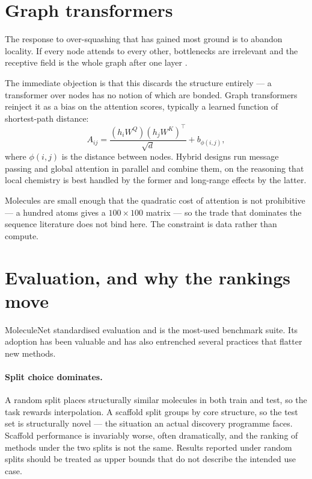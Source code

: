 \documentclass[11pt,a4paper]{article}
\begin{document}
\section{Graph transformers}
\label{sec:transformers}

The response to over-squashing that has gained most ground is to abandon
locality. If every node attends to every other, bottlenecks are irrelevant and
the receptive field is the whole graph after one layer \cite{ying2021}.

The immediate objection is that this discards the structure entirely --- a
transformer over nodes has no notion of which are bonded. Graph transformers
reinject it as a bias on the attention scores, typically a learned function of
shortest-path distance:
\begin{equation}
  A_{ij} = \frac{(h_i W^Q)(h_j W^K)^{\top}}{\sqrt{d}} + b_{\phi(i,j)},
\end{equation}
where $\phi(i,j)$ is the distance between nodes. Hybrid designs
\cite{rampasek2022} run message passing and global attention in parallel and
combine them, on the reasoning that local chemistry is best handled by the
former and long-range effects by the latter.

Molecules are small enough that the quadratic cost of attention is not
prohibitive --- a hundred atoms gives a $100 \times 100$ matrix --- so the
trade that dominates the sequence literature does not bind here. The
constraint is data rather than compute.

\section{Evaluation, and why the rankings move}
\label{sec:evaluation}

MoleculeNet \cite{wu2018} standardised evaluation and is the most-used
benchmark suite. Its adoption has been valuable and has also entrenched
several practices that flatter new methods.

\paragraph{Split choice dominates.}
A random split places structurally similar molecules in both train and test,
so the task rewards interpolation. A scaffold split groups by core structure,
so the test set is structurally novel --- the situation an actual discovery
programme faces. Scaffold performance is invariably worse, often dramatically,
and the ranking of methods under the two splits is not the same. Results
reported under random splits should be treated as upper bounds that do not
describe the intended use case.
\end{document}
